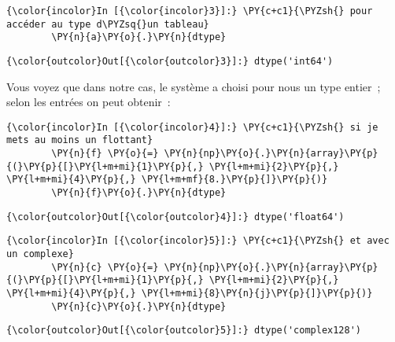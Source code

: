     \begin{Verbatim}[commandchars=\\\{\},frame=single,framerule=0.3mm,rulecolor=\color{cellframecolor}]
{\color{incolor}In [{\color{incolor}3}]:} \PY{c+c1}{\PYZsh{} pour accéder au type d\PYZsq{}un tableau}
        \PY{n}{a}\PY{o}{.}\PY{n}{dtype}
\end{Verbatim}


\begin{Verbatim}[commandchars=\\\{\},frame=single,framerule=0.3mm,rulecolor=\color{cellframecolor}]
{\color{outcolor}Out[{\color{outcolor}3}]:} dtype('int64')
\end{Verbatim}
            
    Vous voyez que dans notre cas, le système a choisi pour nous un type
entier~; selon les entrées on peut obtenir~:

    \begin{Verbatim}[commandchars=\\\{\},frame=single,framerule=0.3mm,rulecolor=\color{cellframecolor}]
{\color{incolor}In [{\color{incolor}4}]:} \PY{c+c1}{\PYZsh{} si je mets au moins un flottant}
        \PY{n}{f} \PY{o}{=} \PY{n}{np}\PY{o}{.}\PY{n}{array}\PY{p}{(}\PY{p}{[}\PY{l+m+mi}{1}\PY{p}{,} \PY{l+m+mi}{2}\PY{p}{,} \PY{l+m+mi}{4}\PY{p}{,} \PY{l+m+mf}{8.}\PY{p}{]}\PY{p}{)}
        \PY{n}{f}\PY{o}{.}\PY{n}{dtype}
\end{Verbatim}


\begin{Verbatim}[commandchars=\\\{\},frame=single,framerule=0.3mm,rulecolor=\color{cellframecolor}]
{\color{outcolor}Out[{\color{outcolor}4}]:} dtype('float64')
\end{Verbatim}
            
    \begin{Verbatim}[commandchars=\\\{\},frame=single,framerule=0.3mm,rulecolor=\color{cellframecolor}]
{\color{incolor}In [{\color{incolor}5}]:} \PY{c+c1}{\PYZsh{} et avec un complexe}
        \PY{n}{c} \PY{o}{=} \PY{n}{np}\PY{o}{.}\PY{n}{array}\PY{p}{(}\PY{p}{[}\PY{l+m+mi}{1}\PY{p}{,} \PY{l+m+mi}{2}\PY{p}{,} \PY{l+m+mi}{4}\PY{p}{,} \PY{l+m+mi}{8}\PY{n}{j}\PY{p}{]}\PY{p}{)}
        \PY{n}{c}\PY{o}{.}\PY{n}{dtype}
\end{Verbatim}


\begin{Verbatim}[commandchars=\\\{\},frame=single,framerule=0.3mm,rulecolor=\color{cellframecolor}]
{\color{outcolor}Out[{\color{outcolor}5}]:} dtype('complex128')
\end{Verbatim}
            
